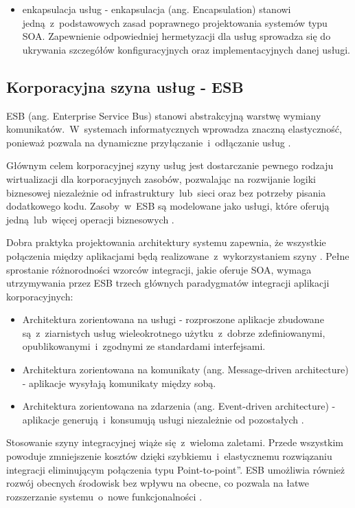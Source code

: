 \begin{itemize}
\item{enkapsulacja usług - enkapsulacja (ang. Encapsulation) stanowi jedną~z~podstawowych zasad poprawnego projektowania systemów typu SOA. Zapewnienie odpowiedniej hermetyzacji dla usług sprowadza się do ukrywania szczegółów konfiguracyjnych oraz implementacyjnych danej usługi.}
\end{itemize}

\subsection{Korporacyjna szyna usług - ESB}
ESB (ang. Enterprise Service Bus) stanowi abstrakcyjną warstwę wymiany komunikatów.~W~systemach informatycznych wprowadza znaczną elastyczność, ponieważ pozwala na dynamiczne przyłączanie~i~odłączanie usług \cite{PlatIntGor}.

Głównym celem korporacyjnej szyny usług jest dostarczanie pewnego rodzaju wirtualizacji dla korporacyjnych zasobów, pozwalając na rozwijanie logiki biznesowej niezależnie od infrastruktury~lub~sieci oraz bez potrzeby pisania dodatkowego kodu. Zasoby~w~ESB są modelowane jako usługi, które oferują jedną~lub~więcej operacji biznesowych \cite{IBMRBSoaPat}.

Dobra praktyka projektowania architektury systemu zapewnia, że wszystkie połączenia między aplikacjami będą realizowane~z~wykorzystaniem szyny \cite{PlatIntGor}. Pełne sprostanie różnorodności wzorców integracji, jakie oferuje SOA, wymaga utrzymywania przez ESB trzech głównych paradygmatów integracji aplikacji korporacyjnych:
\begin{itemize}
\item{Architektura zorientowana na usługi - rozproszone aplikacje zbudowane są~z~ziarnistych usług wieleokrotnego użytku~z~dobrze zdefiniowanymi, opublikowanymi~i~zgodnymi ze standardami interfejsami.}
\item{Architektura zorientowana na komunikaty (ang. Message-driven architecture) - aplikacje wysyłają komunikaty między sobą.}
\item{Architektura zorientowana na zdarzenia (ang. Event-driven architecture) - aplikacje generują~i~konsumują usługi niezależnie od pozostałych \cite{IBMRBSoaPat}.} 
\end{itemize}

Stosowanie szyny integracyjnej wiąże się~z~wieloma zaletami. Przede wszystkim powoduje zmniejszenie kosztów dzięki szybkiemu~i~elastycznemu rozwiązaniu integracji eliminującym połączenia typu \quotedblbase Point-to-point\textquotedblright. ESB umożliwia również rozwój obecnych środowisk bez wpływu na obecne, co pozwala na łatwe rozszerzanie systemu~o~nowe funkcjonalności \cite{IBMRBSoaPat}.

